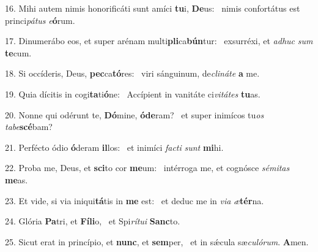 16. Mihi autem nimis honorificáti sunt amíci \textbf{tu}i, \textbf{De}us: \ast\  nimis confortátus est princi\textit{pá}\textit{tus} \textit{e}\textbf{ó}rum.\

17. Dinumerábo eos, et super arénam multi\textbf{pli}ca\textbf{bún}tur: \ast\  exsurréxi, et \textit{ad}\textit{huc} \textit{sum} \textbf{te}cum.\

18. Si occíderis, Deus, \textbf{pec}ca\textbf{tó}res: \ast\  viri sánguinum, de\textit{cli}\textit{ná}\textit{te} \textbf{a} me.\

19. Quia dícitis in cogi\textbf{ta}ti\textbf{ó}ne: \ast\  Accípient in vanitáte ci\textit{vi}\textit{tá}\textit{tes} \textbf{tu}as.\

20. Nonne qui odérunt te, \textbf{Dó}mine, \textbf{ó}\textbf{de}ram? \ast\  et super inimícos tu\textit{os} \textit{ta}\textit{be}\textbf{scé}bam?\

21. Perfécto ódio \textbf{ó}deram \textbf{il}los: \ast\  et inimíci \textit{fac}\textit{ti} \textit{sunt} \textbf{mi}hi.\

22. Proba me, Deus, et \textbf{sci}to cor \textbf{me}um: \ast\  intérroga me, et cognósce \textit{sé}\textit{mi}\textit{tas} \textbf{me}as.\

23. Et vide, si via iniqui\textbf{tá}tis in \textbf{me} est: \ast\  et deduc me in \textit{vi}\textit{a} \textit{æ}\textbf{tér}na.\

24. Glória \textbf{Pa}tri, et \textbf{Fí}\textbf{li}o, \ast\  et Spi\textit{rí}\textit{tu}\textit{i} \textbf{Sanc}to.\

25. Sicut erat in princípio, et \textbf{nunc}, et \textbf{sem}per, \ast\  et in sǽcula sæ\textit{cu}\textit{ló}\textit{rum}. \textbf{A}men.\


